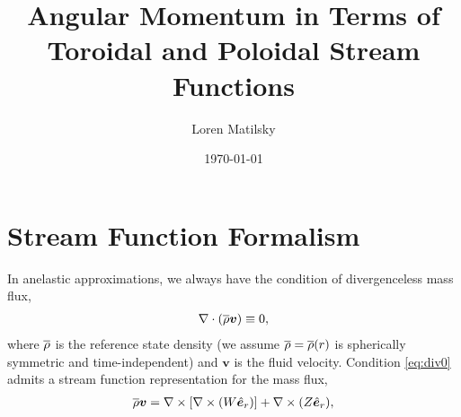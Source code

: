 \documentclass[12pt]{article} %
\date{\today}
\author{Loren Matilsky}
\title{Angular Momentum in Terms of Toroidal and Poloidal Stream Functions}
\begin{document}
	\maketitle
	\section{Stream Function Formalism}
In anelastic approximations, we always have the condition of divergenceless mass flux,
\begin{align}
\nabla\cdot(\overline{\rho}\bm{v})\equiv 0,
\label{eq:div0}
\end{align}
where $\overline{\rho}$ is the reference state density (we assume $\overline{\rho}=\overline{\rho}(r)$ is spherically symmetric and time-independent) and $\bm{v}$ is the fluid velocity. Condition \eqref{eq:div0} admits a stream function representation for the mass flux, 
\begin{align}
\overline{\rho}\bm{v} = \nabla\times [\nabla\times (W\hat{\bm{e}}_r)] + \nabla\times(Z\hat{\bm{e}}_r),
\label{eq:wandz1}
\end{align}



	

\end{document}
